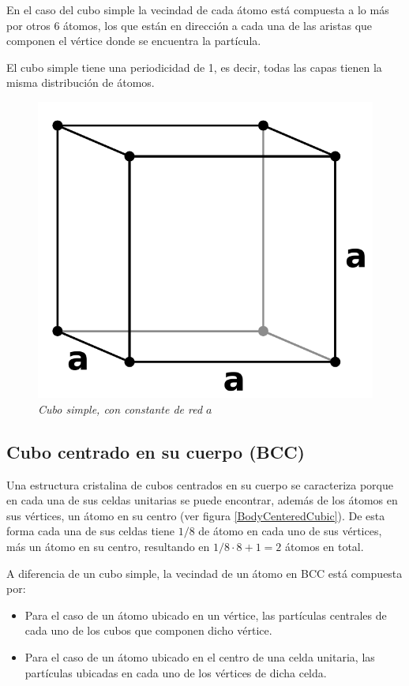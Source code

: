 En el caso del cubo simple la vecindad de cada átomo está compuesta a lo más por otros 6 átomos, los que están en dirección a cada una de las aristas que componen el vértice donde se encuentra la partícula.

El cubo simple tiene una periodicidad de 1, es decir, todas las capas tienen la misma distribución de átomos.

\begin{figure}[ht]
  \centering
  \includegraphics[scale=.6]{images/SimpleCubic}
  \caption{\em Cubo simple, con constante de red $a$}
  \label{SimpleCubic}
\end{figure}


\subsection{Cubo centrado en su cuerpo (BCC)}
Una estructura cristalina de cubos centrados en su cuerpo se caracteriza porque en cada una de sus celdas unitarias se puede encontrar, además de los átomos en sus vértices, un átomo en su centro (ver figura \ref{BodyCenteredCubic}). De esta forma cada una de sus celdas tiene $1/8$ de átomo en cada uno de sus vértices, más un átomo en su centro, resultando en $1/8 \cdot 8 + 1 = 2$ átomos en total.

A diferencia de un cubo simple, la vecindad de un átomo en BCC está compuesta por:

\begin{itemize}
  \item Para el caso de un átomo ubicado en un vértice, las partículas centrales de cada uno de los cubos que componen dicho vértice.
  \item Para el caso de un átomo ubicado en el centro de una celda unitaria, las partículas ubicadas en cada uno de los vértices de dicha celda.
\end{itemize}

